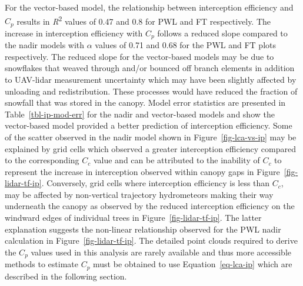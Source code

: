 \documentclass[
  letterpaper,
  DIV=11,
  numbers=noendperiod]{scrartcl}
\begin{document}
For the vector-based model, the relationship between interception
efficiency and \(C_p\) results in \emph{R}\textsuperscript{2} values of
0.47 and 0.8 for PWL and FT respectively. The increase in interception
efficiency with \(C_p\) follows a reduced slope compared to the nadir
models with \(\alpha\) values of 0.71 and 0.68 for the PWL and FT plots
respectively. The reduced slope for the vector-based models may be due
to snowflakes that weaved through and/or bounced off branch elements in
addition to UAV-lidar measurement uncertainty which may have been
slightly affected by unloading and redistribution. These processes would
have reduced the fraction of snowfall that was stored in the canopy.
Model error statistics are presented in Table~\ref{tbl-ip-mod-err} for
the nadir and vector-based models and show the vector-based model
provided a better prediction of interception efficiency. Some of the
scatter observed in the nadir model shown in Figure~\ref{fig-lca-vs-ip}
may be explained by grid cells which observed a greater interception
efficiency compared to the corresponding \(C_c\) value and can be
attributed to the inability of \(C_c\) to represent the increase in
interception observed within canopy gaps in
Figure~\ref{fig-lidar-tf-ip}. Conversely, grid cells where interception
efficiency is less than \(C_c\), may be affected by non-vertical
trajectory hydrometeors making their way underneath the canopy as
observed by the reduced interception efficiency on the windward edges of
individual trees in Figure~\ref{fig-lidar-tf-ip}. The latter explanation
suggests the non-linear relationship observed for the PWL nadir
calculation in Figure~\ref{fig-lidar-tf-ip}. The detailed point clouds
required to derive the \(C_p\) values used in this analysis are rarely
available and thus more accessible methods to estimate \(C_p\) must be
obtained to use Equation~\ref{eq-lca-ip} which are described in the
following section.

\pagebreak
\end{document}
